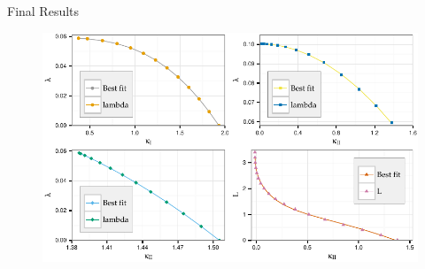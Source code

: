 \documentclass{beamer}
\begin{document}
\begin{frame}{Final Results}
\begin{figure}
  \centerline{\includegraphics[scale=0.7]{overall-fit.pdf}}
\end{figure}
\end{frame}
\end{document}
